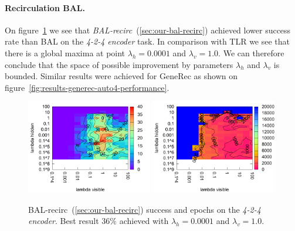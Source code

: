 \paragraph{Recirculation BAL.} 
On figure~\ref{fig:results-bal-recirc-auto4-performance} we see that \emph{BAL-recirc}~(\ref{sec:our-bal-recirc}) achieved lower success rate than BAL on the \emph{4-2-4 encoder} task. In comparison with TLR we see that there is a global maxima at point $\lambda_h = 0.0001$ and $\lambda_v=1.0$. We can therefore conclude that the space of possible improvement by parameters $\lambda_h$ and $\lambda_v$ is bounded. Similar results were achieved for GeneRec as shown on figure~\ref{fig:results-generec-auto4-performance}.
\begin{figure}[H]
  \centering
  \includegraphics[width=0.49\textwidth]{img/bal-recirc-auto4-success.pdf}   
  \includegraphics[width=0.49\textwidth]{img/bal-recirc-auto4-epoch.pdf}     
  \caption{BAL-recirc~(\ref{sec:our-bal-recirc}) success and epochs on the \emph{4-2-4 encoder}. Best result $36\%$ achieved with $\lambda_h = 0.0001$ and $\lambda_v=1.0$.}
  \label{fig:results-bal-recirc-auto4-performance}
\end{figure}



